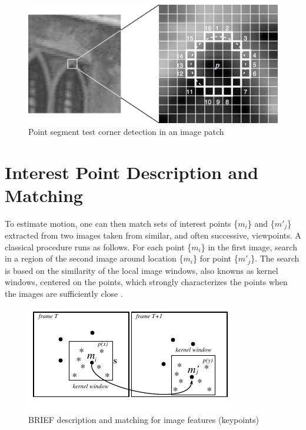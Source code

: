 \begin{figure}[!htb]
  \centering
  \includegraphics[width=380pt]{chapters/computer_vision_library_for_the_web/fast.png}
  \caption{Point segment test corner detection in an image patch \cite{Glass2013}}
  \label{figure:fast}
\end{figure}


\section{Interest Point Description and Matching} %
\label{sec:ar_library_for_the_web:interest_point_matching}

To estimate motion, one can then match sets of interest points \{$m_{i}$\} and \{$m'_{j}$\} extracted from two images taken from similar, and often successive, viewpoints. A classical procedure \cite{Calonder2010} runs as follows. For each point \{$m_{i}$\} in the first image, search in a region of the second image around location \{$m_{i}$\} for point \{$m'_{j}$\}. The search is based on the similarity of the local image windows, also knowns as kernel windows, centered on the points, which strongly characterizes the points when the images are sufficiently close \cite{Lepetit2005}.

\begin{figure}[!htb]
  \centering
  \includegraphics[width=\linewidth]{chapters/computer_vision_library_for_the_web/BRIEF.pdf}
  \caption{BRIEF \cite{Lepetit2005} description and matching for image features (keypoints)}
  \label{figure:BRIEF}
\end{figure}

